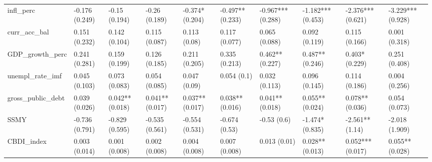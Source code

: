 \begin{table}[H]
\begin{adjustbox}{totalheight=3in, width=\columnwidth }
\begin{subtable}[c]{1.1\textwidth}
{\begin{tabular}{llllllllll}
  infl\_perc & -0.176 (0.249) & -0.15 (0.194) & -0.26 (0.189) & -0.374* (0.204) & -0.497** (0.233) & -0.967*** (0.288) & -1.182*** (0.453) & -2.376*** (0.621) & -3.229*** (0.928) \\ 
  curr\_acc\_bal & 0.151 (0.232) & 0.142 (0.104) & 0.115 (0.087) & 0.113 (0.08) & 0.117 (0.077) & 0.065 (0.088) & 0.092 (0.119) & 0.115 (0.166) & 0.001 (0.318) \\ 
  GDP\_growth\_perc & 0.241 (0.281) & 0.159 (0.199) & 0.126 (0.185) & 0.211 (0.205) & 0.335 (0.213) & 0.462** (0.227) & 0.487** (0.246) & 0.403* (0.229) & 0.251 (0.408) \\ 
  unempl\_rate\_imf & 0.045 (0.103) & 0.073 (0.083) & 0.054 (0.085) & 0.047 (0.09) & 0.054 (0.1) & 0.032 (0.113) & 0.096 (0.145) & 0.114 (0.186) & 0.004 (0.256) \\ 
  gross\_public\_debt & 0.039 (0.026) & 0.042** (0.018) & 0.041** (0.017) & 0.037** (0.017) & 0.038** (0.016) & 0.041** (0.018) & 0.055** (0.024) & 0.078** (0.036) & 0.054 (0.073) \\ 
  SSMY & -0.736 (0.791) & -0.829 (0.595) & -0.535 (0.561) & -0.554 (0.531) & -0.674 (0.53) & -0.53 (0.6) & -1.474* (0.835) & -2.561** (1.14) & -2.018 (1.909) \\ 
  CBDI\_index & 0.003 (0.014) & 0.001 (0.008) & 0.002 (0.008) & 0.004 (0.008) & 0.007 (0.008) & 0.013 (0.01) & 0.028** (0.013) & 0.052*** (0.017) & 0.055** (0.028) \\ 
   \bottomrule
\end{tabular}}



\end{subtable}
\end{adjustbox}
\end{table}
